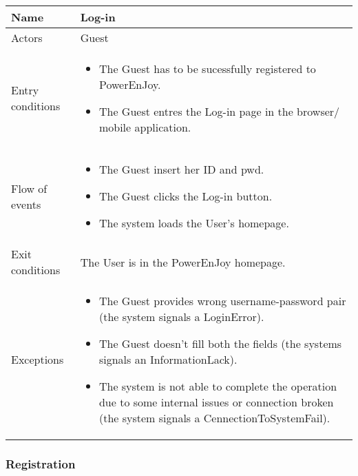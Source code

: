 \begin{center}
  \begin{tabular}{ l | p{10cm} }
    \hline
    \textbf{Name} & \textbf{Log-in} \\ \hline
    Actors & Guest\\ \hline
    Entry conditions & 
\begin{itemize}
\item The Guest has to be sucessfully registered to PowerEnJoy.
\item The Guest entres the Log-in page in the browser/ mobile application. 
\end{itemize} \\ \hline
    Flow of events &
\begin{itemize}
\item The Guest insert her \gls{ID} and \gls{pwd}.
\item The Guest clicks the Log-in button.
\item The system loads the User's homepage.
\end{itemize} \\ \hline
  	Exit conditions & The User is in the PowerEnJoy homepage. \\ \hline
	Exceptions & 
\begin{itemize}
\item The Guest provides wrong username-password pair (the system signals a LoginError).
\item The Guest doesn't fill both the fields (the systems signals an InformationLack).
\item The system is not able to complete the operation due to some internal issues or connection broken (the system signals a CennectionToSystemFail).%
\end{itemize} \\ \hline
  \end{tabular}
\end{center}

\subsubsection{Registration}

